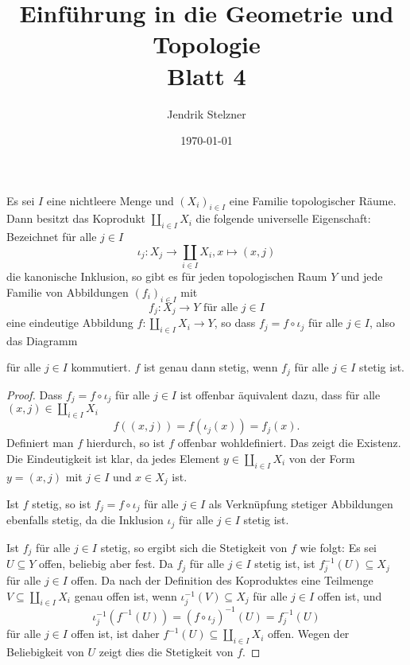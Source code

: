 \documentclass[a4paper,10pt]{article}
\title{\sc Einführung in die Geometrie und Topologie \\ \Large Blatt 4}
\author{Jendrik Stelzner}
\date{\today}
\begin{document}
\maketitle


\begin{lem}\label{lem: universell Koprodukt}
 Es sei $I$ eine nichtleere Menge und $(X_i)_{i \in I}$ eine Familie topologischer Räume. Dann besitzt das Koprodukt $\coprod_{i \in I} X_i$ die folgende universelle Eigenschaft: Bezeichnet für alle $j \in I$
 \[
  \iota_j : X_j \to \coprod_{i \in I} X_i, x \mapsto (x,j)
 \]
 die kanonische Inklusion, so gibt es für jeden topologischen Raum $Y$ und jede Familie von Abbildungen $(f_i)_{i \in I}$ mit
 \[
  f_j : X_j \to Y \text{ für alle } j \in I
 \]
 eine eindeutige Abbildung $f : \coprod_{i \in I} X_i \to Y$, so dass $f_j = f \circ \iota_j$ für alle $j \in I$, also das Diagramm
 \begin{center}
 \end{center}
für alle $j \in I$ kommutiert. $f$ ist genau dann stetig, wenn $f_j$ für alle $j \in I$ stetig ist.
\end{lem}
\begin{proof}
 Dass $f_j = f \circ \iota_j$ für alle $j \in I$ ist offenbar äquivalent dazu, dass für alle $(x,j) \in \coprod_{i \in I} X_i$
 \[
  f((x,j)) = f(\iota_j(x)) = f_j(x).
 \]
 Definiert man $f$ hierdurch, so ist $f$ offenbar wohldefiniert. Das zeigt die Existenz. Die Eindeutigkeit ist klar, da jedes Element $y \in \coprod_{i \in I} X_i$ von der Form $y = (x,j)$ mit $j \in I$ und $x \in X_j$ ist.
 
 Ist $f$ stetig, so ist $f_j = f \circ \iota_j$ für alle $j \in I$ als Verknüpfung stetiger Abbildungen ebenfalls stetig, da die Inklusion $\iota_j$ für alle $j \in I$ stetig ist.
 
 Ist $f_j$ für alle $j \in I$ stetig, so ergibt sich die Stetigkeit von $f$ wie folgt: Es sei $U \subseteq Y$ offen, beliebig aber fest. Da $f_j$ für alle $j \in I$ stetig ist, ist $f_j^{-1}(U) \subseteq X_j$ für alle $j \in I$ offen. Da nach der Definition des Koproduktes eine Teilmenge $V \subseteq \coprod_{i \in I} X_i$ genau offen ist, wenn $\iota_j^{-1}(V) \subseteq X_j$ für alle $j \in I$ offen ist, und
 \[
  \iota_j^{-1}(f^{-1}(U))
  = (f \circ \iota_j)^{-1}(U)
  = f_j^{-1}(U)
 \]
 für alle $j \in I$ offen ist, ist daher $f^{-1}(U) \subseteq \coprod_{i \in I} X_i$ offen. Wegen der Beliebigkeit von $U$ zeigt dies die Stetigkeit von $f$.
\end{proof}
\end{document}
